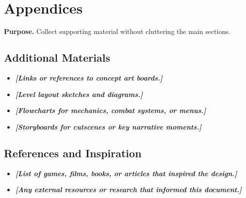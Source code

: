 \documentclass[12pt]{article}
\newcommand{\placeholder}[1]{\textbf{\textit{[#1]}}}
\begin{document}
\section{Appendices}

\textbf{Purpose.} Collect supporting material without cluttering the main sections.

\subsection{Additional Materials}

\begin{itemize}
    \item \placeholder{Links or references to concept art boards.}
    \item \placeholder{Level layout sketches and diagrams.}
    \item \placeholder{Flowcharts for mechanics, combat systems, or menus.}
    \item \placeholder{Storyboards for cutscenes or key narrative moments.}
\end{itemize}

\subsection{References and Inspiration}

\begin{itemize}
    \item \placeholder{List of games, films, books, or articles that inspired the design.}
    \item \placeholder{Any external resources or research that informed this document.}
\end{itemize}
\end{document}
